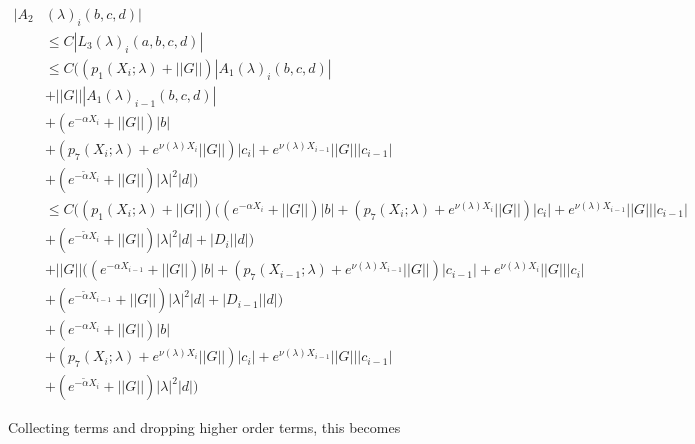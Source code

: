 \documentclass[12pt]{article}
\begin{document}
\begin{align*}
|A_2&(\lambda)_i(b, c, d)| \\
&\leq C |L_3(\lambda)_i(a, b, c, d)| \\
&\leq C \Big( (p_1(X_i; \lambda) + ||G||)|A_1(\lambda)_i(b, c, d)| \\
&+ ||G|||A_1(\lambda)_{i-1}(b, c, d)| \\
&+ (e^{-\alpha X_i} + ||G||) |b| \\
&+ ( p_7(X_i; \lambda) + e^{\nu(\lambda)X_i} ||G||) |c_i| + e^{\nu(\lambda)X_{i-1}} ||G|| |c_{i-1}| \\
&+ (e^{-\tilde{\alpha} X_i} + ||G||) |\lambda|^2 |d| \Big) \\
&\leq C \Big( (p_1(X_i; \lambda) + ||G||) ((e^{-\alpha X_i} + ||G||) |b| 
+ ( p_7(X_i; \lambda) + e^{\nu(\lambda)X_i} ||G||) |c_i| + e^{\nu(\lambda)X_{i-1}} ||G|| |c_{i-1}| \\
&+ (e^{-\tilde{\alpha} X_i} + ||G||) |\lambda|^2 |d| + |D_i||d| )\\
&+ ||G||((e^{-\alpha X_{i-1}} + ||G||) |b| 
+ ( p_7(X_{i-1}; \lambda) + e^{\nu(\lambda)X_{i-1}} ||G||) |c_{i-1}| + e^{\nu(\lambda)X_i} ||G|| |c_i| \\
&+ (e^{-\tilde{\alpha} X_{i-1}} + ||G||) |\lambda|^2 |d| + |D_{i-1}||d| ) \\
&+ (e^{-\alpha X_i} + ||G||) |b| \\
&+ ( p_7(X_i; \lambda) + e^{\nu(\lambda)X_i} ||G||) |c_i| + e^{\nu(\lambda)X_{i-1}} ||G|| |c_{i-1}| \\
&+ (e^{-\tilde{\alpha} X_i} + ||G||) |\lambda|^2 |d| \Big)
\end{align*} 

Collecting terms and dropping higher order terms, this becomes
\end{document}

